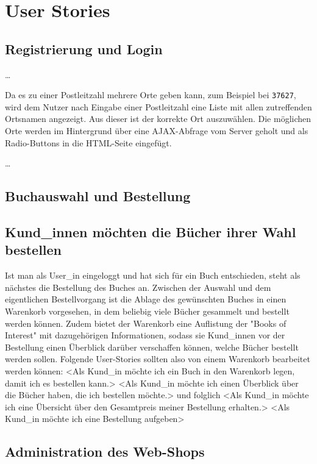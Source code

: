 \section{User Stories}
	\subsection{Registrierung und Login}
	\dots
	
	Da es zu einer Postleitzahl mehrere Orte geben kann, zum Beispiel bei \lstinline|37627|, wird dem Nutzer nach Eingabe einer Postleitzahl eine Liste mit allen zutreffenden Ortsnamen angezeigt. Aus dieser ist der korrekte Ort auszuwählen. Die möglichen Orte werden im Hintergrund über eine AJAX-Abfrage vom Server geholt und als Radio-Buttons in die HTML-Seite eingefügt.
	
	\dots
	
	\subsection{Buchauswahl und Bestellung}
	\subsection{Kund\_innen möchten die Bücher ihrer Wahl bestellen}
	 Ist man als User\_in eingeloggt und hat sich für ein Buch entschieden, steht als nächstes die Bestellung des Buches an. Zwischen der Auswahl und dem eigentlichen Bestellvorgang ist die Ablage des gewünschten Buches in einen Warenkorb vorgesehen, in dem beliebig viele Bücher gesammelt und bestellt werden können. Zudem bietet der Warenkorb eine Auflistung der "Books of Interest" mit dazugehörigen Informationen, sodass sie Kund\_innen vor der Bestellung einen Überblick darüber verschaffen können, welche Bücher bestellt werden sollen. Folgende User-Stories sollten also von einem Warenkorb bearbeitet werden können:
	 <Als Kund\_in möchte ich ein Buch in den Warenkorb legen, damit ich es bestellen kann.>
	 <Als Kund\_in möchte ich einen Überblick über die Bücher haben, die ich bestellen möchte.>
	 und folglich <Als Kund\_in möchte ich eine Übersicht über den Gesamtpreis meiner Bestellung erhalten.>
	 <Als Kund\_in möchte ich eine Bestellung aufgeben>
	 
	\subsection{Administration des Web-Shops}
